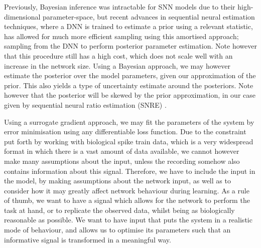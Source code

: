 \documentclass[mphil,deptreport,ianc]{infthesis} %
\begin{document}
Previously, Bayesian inference was intractable for SNN models due to their high-dimensional parameter-space, but recent advances in sequential neural estimation techniques, where a DNN is trained to estimate a prior using a relevant statistic, has allowed for much more efficient sampling using this amortised approach; sampling from the DNN to perform posterior parameter estimation.
Note however that this procedure still has a high cost, which does not scale well with an increase in the network size.
Using a Bayesian approach, we may however estimate the posterior over the model parameters, given our approximation of the prior. This also yields a type of uncertainty estimate around the posteriors. Note however that the posterior will be skewed by the prior approximation, in our case given by sequential neural ratio estimation (SNRE) \cite{Lueckmann2021}.
 
Using a surrogate gradient approach, we may fit the parameters of the system by error minimisation using any differentiable loss function. Due to the constraint put forth by working with biological spike train data, which is a very widespread format in which there is a vast amount of data available, we cannot however make many assumptions about the input, unless the recording somehow also contains information about this signal. 
Therefore, we have to include the input in the model, by making assumptions about the network input, as well as to consider how it may greatly affect network behaviour during learning. As a rule of thumb, we want to have a signal which allows for the network to perform the task at hand, or to replicate the observed data, whilst being as biologically reasonable as possible.
We want to have input that puts the system in a realistic mode of behaviour, and allows us to optimise its parameters such that an informative signal is transformed in a meaningful way.


\end{document}
